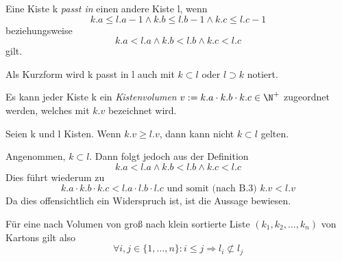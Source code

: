 \begin{defi}[$\subset$]
Eine Kiste k \emph{passt in} einen andere Kiste l, wenn
\[ k.a \leq l.a-1 \wedge k.b \leq l.b-1 \wedge k.c \leq l.c-1 \] beziehungsweise
\[ k.a < l.a \wedge k.b < l.b \wedge k.c < l.c \] gilt.
\end{defi}
\begin{bem}
Als Kurzform wird k passt in l auch mit $k \subset l$ oder $l \supset k$ notiert.
\end{bem}
\begin{defi}[Kistenvolumen]
  Es kann jeder Kiste k ein \emph{Kistenvolumen} $v := k.a \cdot k.b \cdot k.c \in \N^+$ zugeordnet werden, welches mit $k.v$ bezeichnet wird.
\end{defi}
\begin{satz}
 Seien k und l Kisten. Wenn $k.v \geq l.v$, dann kann nicht $k \subset l$ gelten.
\end{satz}
\begin{bew}
Angenommen, $k \subset l$. Dann folgt jedoch aus der Definition
\[ k.a < l.a \wedge k.b < l.b \wedge k.c < l.c \]
Dies führt wiederum zu
\[ k.a \cdot k.b \cdot k.c < l.a \cdot l.b \cdot l.c \text{ und somit (nach B.3) } k.v < l.v \]
Da dies offensichtlich ein Widerspruch ist, ist die Aussage bewiesen.
\end{bew}
\begin{koro}
Für eine nach Volumen von groß nach klein sortierte Liste $(k_1, k_2, \dots, k_n)$ von Kartons gilt also
\[ \forall i,j \in \{1,\dots,n\}: i \leq j \Rightarrow l_i \not\subset l_j \]
\end{koro}

